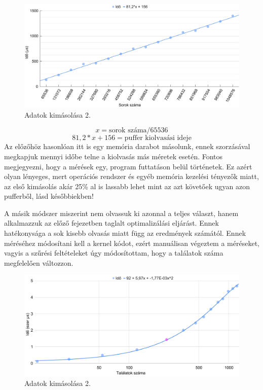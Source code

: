 \begin{figure}[h!]
\centering
\includegraphics[width=14.8cm]{images/graph/pufferout.png}
\caption{Adatok kimásolása 2.}
\label{fig:schema}
\end{figure}

$$ x = \text{sorok száma} / 65536 $$
$$ 81,2*x + 156 = \text{puffer kiolvasási ideje} $$ 
Az előzőhöz hasonlóan itt is egy memória darabot másolunk, ennek szorzásával megkapjuk mennyi időbe telne a kiolvasás más méretek esetén.
Fontos megjegyezni, hogy a mérések egy, program futtatáson belül történetek. Ez azért olyan lényeges, mert operációs rendszer és egyéb memória kezelési tényezők miatt, az első kimásolás akár 25\% al is lassabb lehet mint az azt követőek ugyan azon pufferből, lásd későbbiekben!

A másik módszer miszerint nem olvassuk ki azonnal a teljes választ, hanem alkalmazzuk az előző fejezetben taglalt optimalizálási eljárást.
Ennek hatékonysága a sok kisebb olvasás miatt függ az eredmények számától. Ennek méréséhez módosítani kell a kernel kódot, ezért manuálisan végeztem a méréseket, vagyis a szűrési feltételeket úgy módosítottam, hogy a találatok száma megfelelően változzon.

\begin{figure}[h!]
\centering
\includegraphics[width=14.8cm]{images/graph/outpuffer2_1.png}
\caption{Adatok kimásolása 2.}
\label{fig:schema}
\end{figure}

